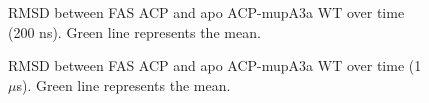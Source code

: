 \begin{singlespacing}
		\setlength\fboxsep{5pt}
		\setlength\fboxrule{1.5pt}
		\begin{figure}[htbp]
		\centering
		\caption[RMSD between FAS ACP and apo ACP-mupA3a WT over time (200 ns).]{RMSD between FAS ACP and apo ACP-mupA3a WT over time (200 ns). Green line represents the mean.}
		\label{fig:RmsdAcpWild}
		\end{figure}	

		\setlength\fboxsep{5pt}
		\setlength\fboxrule{1.5pt}
		\begin{figure}[htbp]
		\centering
		\caption[RMSD between FAS ACP and apo ACP-mupA3a WT over time (1 $ \mu $s).]{RMSD between FAS ACP and apo ACP-mupA3a WT over time (1 $ \mu $s). Green line represents the mean.}
		\label{fig:RmsdAcpWild_1000}
		\end{figure}	
		

\end{singlespacing}
